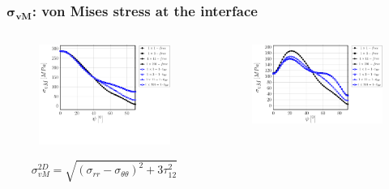 \documentclass[first,firstsupp,lastsupp,last,hyperref,table]{ETHclass}
\begin{document}
\begin{frame}
\frametitle{\vspace{0.2cm}\small $\mathbf{\sigma_{vM}}$: von Mises stress at the interface}
\vspace{-.75cm}
\centering
\begin{columns}[c]
\centering
\begin{column}{0.5\textwidth}
\centering
\begin{figure}
\centering
\includegraphics[width=\columnwidth]{vf60-nodamage-vM2D-notol.pdf}
\end{figure}
\vspace{-0.5cm}
\scriptsize
\begin{equation*}
\sigma^{2D}_{vM}=\sqrt{\left(\sigma_{rr}-\sigma_{\theta\theta}\right)^{2}+3\tau_{12}^{2}}
\end{equation*}
\end{column}
\begin{column}{0.5\textwidth}
\centering
\begin{figure}
\centering
\includegraphics[width=\columnwidth]{vf60-nodamage-vM3D.pdf}

\end{figure}
\end{column}
\end{columns}
\end{frame}
\end{document}
